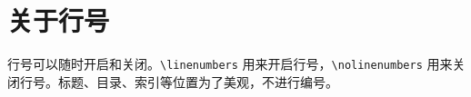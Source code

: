 \documentclass[puretext]{simplivre}
\providecommand{\meta}[1]{$\langle${\normalfont\itshape#1}$\rangle$}
\providecommand{\simplivre}{\textsf{simplivre}}
\begin{document}








\section{关于行号}
行号可以随时开启和关闭。\lstinline|\linenumbers| 用来开启行号，\lstinline|\nolinenumbers| 用来关闭行号。标题、目录、索引等位置为了美观，不进行编号。
\end{document}
